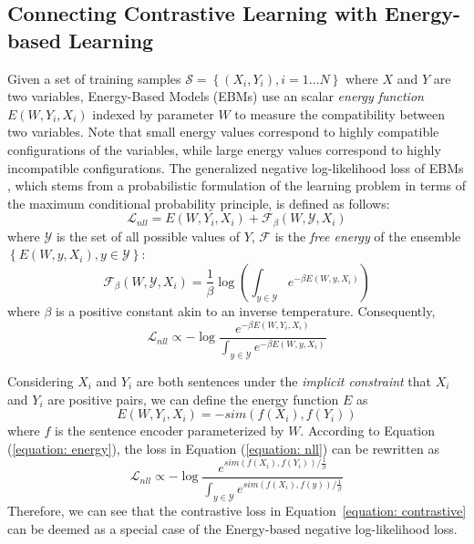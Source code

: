 \documentclass[11pt]{article}
\begin{document}
\subsection{Connecting Contrastive Learning with Energy-based Learning}
\label{sec: connect}
Given a set of training samples $\mathcal{S}=\left\{(X_i, Y_i), i=1\ldots N\right\}$ where $X$ and $Y$ are two variables, Energy-Based Models (EBMs) use an scalar \textit{energy function} $E(W,Y_i,X_i)$ indexed by parameter $W$ to measure the compatibility between two variables. Note that small energy values correspond to highly compatible configurations of the variables, while large energy values correspond to highly incompatible configurations.
The generalized negative log-likelihood loss of EBMs \cite{lecun2006tutorial}, which stems from a probabilistic formulation of the learning problem in terms of the maximum conditional probability principle, is defined as follows:
\begin{equation}
\mathcal{L}_{nll}=E(W,Y_i,X_i)+\mathcal{F}_{\beta}(W, \mathcal{Y}, X_i)
\end{equation}
where $\mathcal{Y}$ is the set of all possible values of $Y$, $\mathcal{F}$ is the \textit{free energy} of the ensemble $\left\{E(W,y,X_i), y\in \mathcal{Y}\right\}$:
\begin{equation}
\mathcal{F}_{\beta}(W, \mathcal{Y}, X_i)=
\frac{1}{\beta}\log\left(\int_{y\in \mathcal{Y}}e^{-\beta E(W,y,X_i)}\right)
\end{equation}
where $\beta$ is a positive constant akin to an inverse temperature. Consequently, 
\begin{equation}
\mathcal{L}_{nll}\propto
-\log\frac{e^{-\beta \text{$E(W,Y_i,X_i)$}}}{\int_{y\in \mathcal{Y}}e^{-\beta E(W,y,X_i)}}
\label{equation: nll}
\end{equation}

Considering $X_i$ and $Y_i$ are both sentences under the \textit{implicit constraint} that $X_i$ and $Y_i$ are positive pairs, we can define the energy function $E$ as
\begin{equation}
E(W,Y_i,X_i) = -sim(f(X_i),f(Y_i))
\label{equation: energy}
\end{equation}
where $f$ is the sentence encoder parameterized by $W$. According to Equation (\ref{equation: energy}), the loss in Equation (\ref{equation: nll}) can be rewritten as
\begin{equation}
\mathcal{L}_{nll}\propto
-\log\frac{e^{sim(f(X_i),f(Y_i))/ \frac{1}{\beta}}}
{\int_{y\in \mathcal{Y}}e^{sim(f(X_i),f(y))/ \frac{1}{\beta}}}
\end{equation}
Therefore, we can see that the contrastive loss in Equation~\eqref{equation: contrastive} can be deemed as a special case of the Energy-based negative log-likelihood loss.
\end{document}
